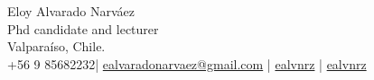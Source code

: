 \documentclass[10pt,a4paper]{article}
\begin{document}
 

\newcommand{\name}{Eloy Alvarado Narváez}
\newcommand{\datebirth}{18 de agosto, 1990}
\newcommand{\address}{Valparaíso, Chile.}
\newcommand{\phone}{+56 9 85682232}
\newcommand{\email}{ealvaradonarvaez@gmail.com}
\newcommand{\github}{ealvnrz}
\newcommand{\linkedin}{ealvnrz}

\begin{center}
\huge\name\\
\normalsize Phd candidate and lecturer\\
\address\\
 \phone \hspace{5pt}|\hspace{5pt}  \href{mailto:\email}{\email}
\hspace{5pt}|\hspace{5pt}  \href{https://github.com/ealvnrz}{\github}
\hspace{5pt}|\hspace{5pt}  \href{https://www.linkedin.com/in/ealvnrz/}{\linkedin}
\end{center}






\end{document}
